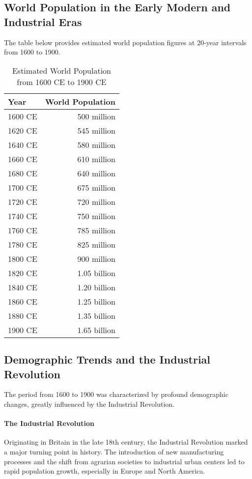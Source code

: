 \documentclass{book}
\begin{document}
\subsection*{World Population in the Early Modern and Industrial Eras}
The table below provides estimated world population figures at 20-year intervals from 1600 to 1900.

\begin{table}[h!]
\centering
\begin{tabular}{|l|r|}
\hline
Year & World Population \\
\hline
1600 CE & 500 million \\
1620 CE & 545 million \\
1640 CE & 580 million \\
1660 CE & 610 million \\
1680 CE & 640 million \\
1700 CE & 675 million \\
1720 CE & 720 million \\
1740 CE & 750 million \\
1760 CE & 785 million \\
1780 CE & 825 million \\
1800 CE & 900 million \\
1820 CE & 1.05 billion \\
1840 CE & 1.20 billion \\
1860 CE & 1.25 billion \\
1880 CE & 1.35 billion \\
1900 CE & 1.65 billion \\
\hline
\end{tabular}
\caption{Estimated World Population from 1600 CE to 1900 CE}
\label{tab:world_population_1600_1900}
\end{table}

\subsection*{Demographic Trends and the Industrial Revolution}
The period from 1600 to 1900 was characterized by profound demographic changes, greatly influenced by the Industrial Revolution.

\paragraph{The Industrial Revolution}
Originating in Britain in the late 18th century, the Industrial Revolution marked a major turning point in history. The introduction of new manufacturing processes and the shift from agrarian societies to industrial urban centers led to rapid population growth, especially in Europe and North America.
\end{document}
